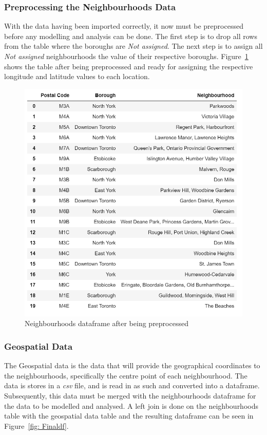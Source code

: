 \documentclass[12pt, conference]{IEEEtran}
\begin{document}
\subsubsection{Preprocessing the Neighbourhoods Data}
With the data having been imported correctly, it now must be preprocessed before any modelling and analysis can be done. The first step is to drop all rows from the table where the boroughs are \textit{Not assigned}. The next step is to assign all \textit{Not assigned} neighbourhoods the value of their respective boroughs. Figure~\ref{fig: Preproc} shows the table after being preprocessed and ready for assigning the respective longitude and latitude values to each location.

\begin{figure}[!h]
\center
\includegraphics[scale=0.8]{Preproc}
\caption{Neighbourhoods dataframe after being preprocessed}
\label{fig: Preproc}
\end{figure}

\subsubsection{Geospatial Data}
The Geospatial data is the data that will provide the geographical coordinates to the neighbourhoods, specifically the centre point of each neighbourhood. The data is stores in a \textit{csv} file, and is read in as such and converted into a dataframe. Subsequently, this data must be merged with the neighbourhoods dataframe for the data to be modelled and analysed. A left join is done on the neighbourhoods table with the geospatial data table and the resulting dataframe can be seen in Figure~\ref{fig: Finaldf}.
\end{document}
